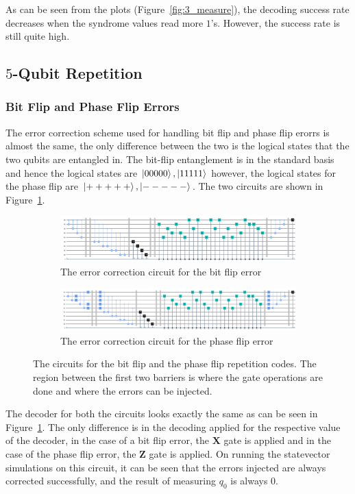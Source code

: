 \documentclass[11pt]{article}
\begin{document}
As can be seen from the plots (Figure~\ref{fig:3_measure}), the decoding success rate decreases when the syndrome values read more $1$'s. However, the success rate is still quite high.

\subsection{$5$-Qubit Repetition}
\subsubsection{Bit Flip and Phase Flip Errors}
The error correction scheme used for handling bit flip and phase flip erorrs is almost the same, the only difference between the two is the logical states that the two qubits are entangled in. The bit-flip entanglement is in the standard basis and hence the logical states are $\ket{00000}, \ket{11111}$ however, the logical states for the phase flip are $\ket{+++++}, \ket{-----}$. The two circuits are shown in Figure~\ref{fig:5}.
\begin{figure}[h!]
    \begin{subfigure}{\linewidth}
        \includegraphics[width=\linewidth]{outputs/bit_5.png}
        \caption{The error correction circuit for the bit flip error}
    \end{subfigure}
    \begin{subfigure}{\linewidth}
        \includegraphics[width=\linewidth]{outputs/phase_5.png}
        \caption{The error correction circuit for the phase flip error}
    \end{subfigure}
    \caption{The circuits for the bit flip and the phase flip repetition codes. The region between the first two barriers is where the gate operations are done and where the errors can be injected.}\label{fig:5}
\end{figure}

The decoder for both the circuits looks exactly the same as can be seen in Figure~\ref{fig:5}. The only difference is in the decoding applied for the respective value of the decoder, in the case of a bit flip error, the $\mathbf{X}$ gate is applied and in the case of the phase flip error, the $\mathbf{Z}$ gate is applied. On running the statevector simulations on this circuit, it can be seen that the errors injected are always corrected successfully, and the result of measuring $q_0$ is always $0$.
\end{document}
